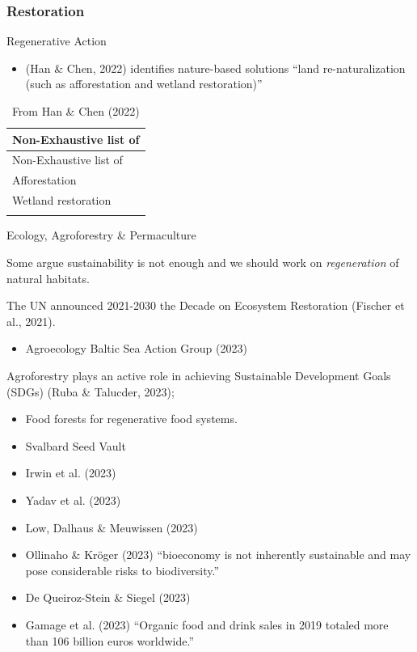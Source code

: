 \documentclass[
  letterpaper,
  DIV=11,
  numbers=noendperiod]{scrartcl}
\providecommand{\tightlist}{%
  \setlength{\itemsep}{0pt}\setlength{\parskip}{0pt}}\usepackage{longtable,booktabs,array}
\begin{document}
\subsubsection{Restoration}\label{restoration}

Regenerative Action

\begin{itemize}
\tightlist
\item
  (Han \& Chen, 2022) identifies nature-based solutions ``land
  re-naturalization (such as afforestation and wetland restoration)''
\end{itemize}

\begin{longtable}[]{@{}l@{}}
\caption{From Han \& Chen (2022)}\tabularnewline
\toprule\noalign{}
Non-Exhaustive list of \\
\midrule\noalign{}
\endfirsthead
\toprule\noalign{}
Non-Exhaustive list of \\
\midrule\noalign{}
\endhead
\bottomrule\noalign{}
\endlastfoot
Afforestation \\
Wetland restoration \\
 \\
\end{longtable}

Ecology, Agroforestry \& Permaculture

Some argue sustainability is not enough and we should work on
\emph{regeneration} of natural habitats.

The UN announced 2021-2030 the Decade on Ecosystem Restoration (Fischer
et al., 2021).

\begin{itemize}
\tightlist
\item
  Agroecology Baltic Sea Action Group (2023)
\end{itemize}

Agroforestry plays an active role in achieving Sustainable Development
Goals (SDGs) (Ruba \& Talucder, 2023);

\begin{itemize}
\tightlist
\item
  Food forests for regenerative food systems.
\item
  Svalbard Seed Vault
\item
  Irwin et al. (2023)
\item
  Yadav et al. (2023)
\item
  Low, Dalhaus \& Meuwissen (2023)
\item
  Ollinaho \& Kröger (2023) ``bioeconomy is not inherently sustainable
  and may pose considerable risks to biodiversity.''
\item
  De Queiroz-Stein \& Siegel (2023)
\item
  Gamage et al. (2023) ``Organic food and drink sales in 2019 totaled
  more than 106 billion euros worldwide.''
\end{itemize}
\end{document}
